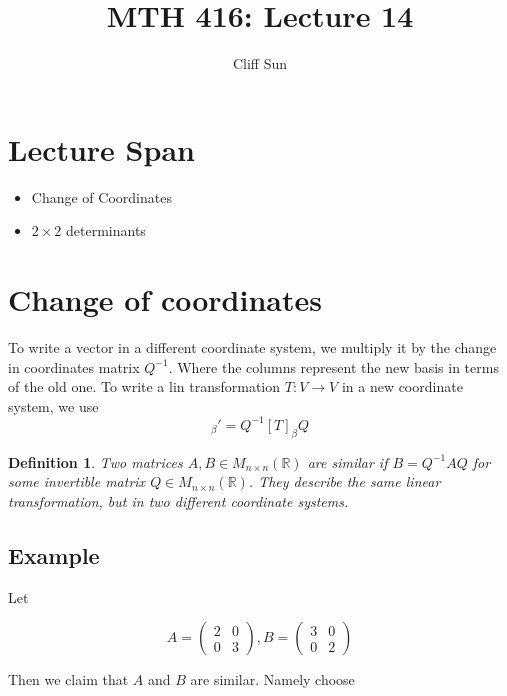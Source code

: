 \documentclass{article}
\title{MTH 416: Lecture 14}
\author{Cliff Sun}
\newtheorem{definition}[theorem]{Definition}
\newtheorem{one minute paper}[theorem]{One Minute Paper}
\begin{document}
\maketitle

\section*{Lecture Span}
\begin{itemize}
    \item Change of Coordinates
    \item $2 \times 2$ determinants
\end{itemize}

\section*{Change of coordinates}

To write a vector in a different coordinate system, we multiply it by the change in coordinates matrix $Q^{-1}$. Where the 
columns represent the new basis in terms of the old one. To write a lin transformation $T: V \rightarrow V$ in a new coordinate system, we use 
\begin{equation}
    [T]_\beta' = Q^{-1}[T]_\beta Q
\end{equation}

\begin{definition}
    Two matrices $A,B \in M_{n \times n}(\mathbb{R})$ are similar if $B = Q^{-1}AQ$ for some invertible matrix $Q \in M_{n\times n}(\mathbb{R})$. They describe the same linear transformation, 
    but in two different coordinate systems. 
\end{definition}

\subsection*{Example}

Let
\begin{center}
    \[A = \begin{pmatrix}
        2 & 0 \\
        0 & 3
    \end{pmatrix}, B = \begin{pmatrix}
        3 & 0 \\
        0 & 2
    \end{pmatrix}\]
\end{center}

Then we claim that $A$ and $B$ are similar. Namely choose
\end{document}
